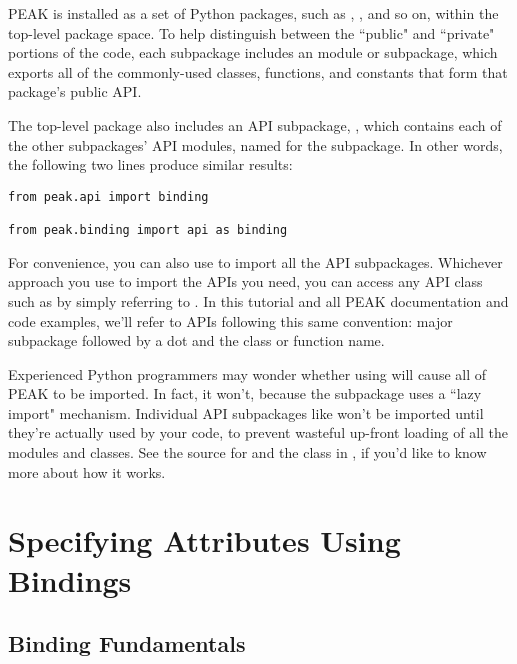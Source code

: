 PEAK is installed as a set of Python packages, such as ,
, and so on, within the top-level  package
space.  To help distinguish between the ``public" and ``private" portions of
the code, each subpackage includes an  module or subpackage, which
exports all of the commonly-used classes, functions, and constants that form
that package's public API.

The top-level package also includes an API subpackage, , which
contains each of the other subpackages' API modules, named for the subpackage.
In other words, the following two lines produce similar results:

\begin{verbatim}
from peak.api import binding

from peak.binding import api as binding
\end{verbatim}

For convenience, you can also use  to import all
the API subpackages.  Whichever approach you use to import the APIs you need,
you can access any  API class such as 
by simply referring to .  In this tutorial and all PEAK
documentation and code examples, we'll refer to APIs following this same
convention: major subpackage followed by a dot and the class or function name.

\begin{notice}
Experienced Python programmers may wonder whether using
 will cause all of PEAK to be imported.  In
fact, it won't, because the  subpackage uses a 
``lazy import" mechanism.  Individual API subpackages like 
won't be imported until they're actually used by your code, to prevent wasteful
up-front loading of all the modules and classes.  See the source for
 and the  class in
, if you'd like to know more about how it works.
\end{notice} 

\newpage

\section{Specifying Attributes Using Bindings}

\subsection{Binding Fundamentals}

